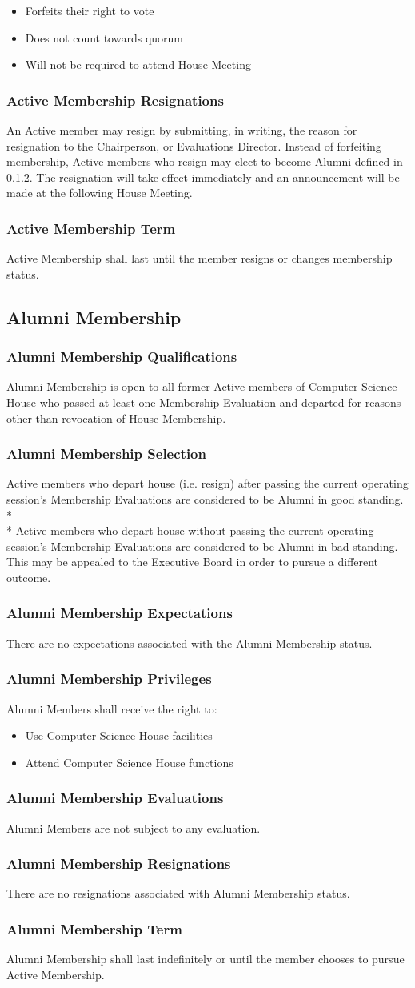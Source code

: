\documentclass{article}
\newcommand{\asection}[1]{\subsection{#1} \label{#1}}
\newcommand{\asubsection}[1]{\subsubsection{#1} \label{#1}}
\begin{document}
\begin{itemize}
	\item Forfeits their right to vote
	\item Does not count towards quorum
	\item Will not be required to attend House Meeting
\end{itemize}
\asubsection{Active Membership Resignations}
An Active member may resign by submitting, in writing, the reason for resignation to the Chairperson, or Evaluations Director.
Instead of forfeiting membership, Active members who resign may elect to become Alumni defined in \ref{Alumni Membership Selection}.
The resignation will take effect immediately and an announcement will be made at the following House Meeting.
\asubsection{Active Membership Term}
Active Membership shall last until the member resigns or changes membership status.

\asection{Alumni Membership}
\asubsection{Alumni Membership Qualifications}
Alumni Membership is open to all former Active members of Computer Science House who passed at least one Membership Evaluation and departed for reasons other than revocation of House Membership.
\asubsection{Alumni Membership Selection}
Active members who depart house (i.e. resign) after passing the current operating session's Membership Evaluations are considered to be Alumni in good standing.
\\*\\*
Active members who depart house without passing the current operating session's Membership Evaluations are considered to be Alumni in bad standing.
This may be appealed to the Executive Board in order to pursue a different outcome.
\asubsection{Alumni Membership Expectations}
There are no expectations associated with the Alumni Membership status.
\asubsection{Alumni Membership Privileges}
Alumni Members shall receive the right to:
\begin{itemize}
	\item Use Computer Science House facilities
	\item Attend Computer Science House functions
\end{itemize}
\asubsection{Alumni Membership Evaluations}
Alumni Members are not subject to any evaluation.
\asubsection{Alumni Membership Resignations}
There are no resignations associated with Alumni Membership status.
\asubsection{Alumni Membership Term}
Alumni Membership shall last indefinitely or until the member chooses to pursue Active Membership.
\end{document}
